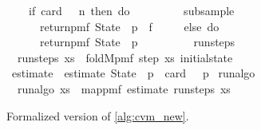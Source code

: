 \documentclass[a4paper,UKenglish,cleveref, autoref, thm-restate]{lipics-v2021}
\newenvironment{isabelle_cm}{\begin{mdframed}[backgroundcolor=shadecolor,nobreak=true,linewidth=0]\begin{isabelle}}{\end{isabelle}\end{mdframed}}%
\begin{document}
\begin{figure}[t]
\begin{isabelle_cm}
\isanewline
\ \ \ \ if\ card\ {\isasymchi}\ {\isacharequal}{\kern0pt}\ n\ then\ do\ {\isacharbraceleft}{\kern0pt}\isanewline
\ \ \ \ \ \ {\isasymchi}\ {\isasymleftarrow}\ subsample\ {\isasymchi}{\isacharsemicolon}{\kern0pt}\isanewline
\ \ \ \ \ \ return{\isacharunderscore}{\kern0pt}pmf\ {\isacharparenleft}{\kern0pt}State\ {\isasymchi}\ {\isacharparenleft}{\kern0pt}p\ {\isacharasterisk}{\kern0pt}\ f{\isacharparenright}{\kern0pt}{\isacharparenright}{\kern0pt}\isanewline
\ \ \ \ {\isacharbraceright}{\kern0pt}\ else\ do\ {\isacharbraceleft}{\kern0pt}\isanewline
\ \ \ \ \ \ return{\isacharunderscore}{\kern0pt}pmf\ {\isacharparenleft}{\kern0pt}State\ {\isasymchi}\ p{\isacharparenright}{\kern0pt}\isanewline
\ \ \ \ {\isacharbraceright}{\kern0pt}\isanewline
\ \ \ {\isacharbraceright}{\kern0pt}{\isacartoucheclose}\isanewline
\isanewline
{}\isamarkupfalse%
\ run{\isacharunderscore}{\kern0pt}steps\ \ %
\hfill{}\isanewline
\ \ {\isacartoucheopen}run{\isacharunderscore}{\kern0pt}steps\ xs\ {\isacharequal}{\kern0pt}\ foldM{\isacharunderscore}{\kern0pt}pmf\ step\ xs\ initial{\isacharunderscore}{\kern0pt}state{\isacartoucheclose}\isanewline
{}\isamarkupfalse%
\ estimate\ \
{\isacartoucheopen}estimate\ {\isacharparenleft}{\kern0pt}State\ {\isasymchi}\ p{\isacharparenright}{\kern0pt}\ {\isacharequal}{\kern0pt}\ card\ {\isasymchi}\ {\isacharslash}{\kern0pt}\ p{\isacartoucheclose}\isanewline
\isacommand{fun}\isamarkupfalse%
\ run{\isacharunderscore}{\kern0pt}algo\ \ %
\hfill{}\isanewline
\ \ {\isacartoucheopen}run{\isacharunderscore}{\kern0pt}algo\ xs\ {\isacharequal}{\kern0pt}\ map{\isacharunderscore}{\kern0pt}pmf\ estimate\ {\isacharparenleft}{\kern0pt}run{\isacharunderscore}{\kern0pt}steps\ xs{\isacharparenright}{\kern0pt}{\isacartoucheclose}\isanewline
{\normalfont [\dots]}\isanewline
{}
\end{isabelle_cm}
\caption{Formalized version of \cref{alg:cvm_new}.}\label{alg:cvm_formalized}
\end{figure}
\end{document}
